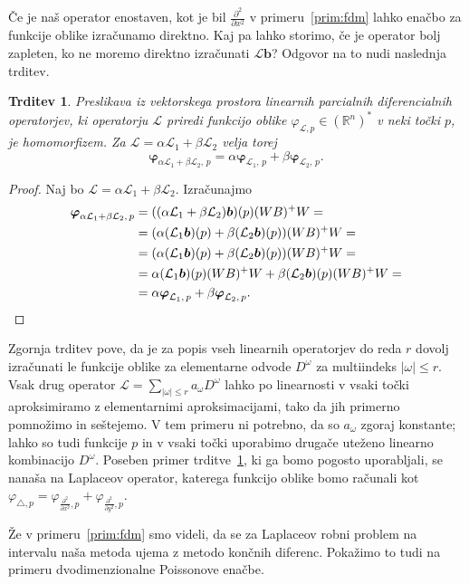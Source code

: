 \documentclass[12pt,a4paper,twoside]{article}
\theoremstyle{definition} %
\theoremstyle{plain} %
\newtheorem{trditev}[definicija]{Trditev}
\numberwithin{equation}{section}
\newcommand{\R}{\mathbb R}
\renewcommand{\L}{\mathcal{L}}
\newcommand{\lap}{\triangle}
\renewcommand{\b}{\boldsymbol}
\renewcommand{\phi}{\varphi}
\newcommand{\dpar}[2]{\ensuremath{\frac{\partial #1}{\partial #2}}}
\begin{document}
Če je naš operator enostaven, kot je bil $\dpar{^2}{x^2}$ v primeru~\ref{prim:fdm}
lahko enačbo za funkcije oblike izračunamo direktno. Kaj pa lahko storimo, če je operator bolj
zapleten, ko ne moremo direktno izračunati $\L \b b$? Odgovor na to nudi naslednja trditev.
\begin{trditev}
  \label{trd:shape-linear}
  Preslikava iz vektorskega prostora linearnih parcialnih diferencialnih operatorjev, ki operatorju
  $\L$ priredi funkcijo oblike $\phi_{\L, p} \in (\R^n)^\ast$ v neki točki $p$, je homomorfizem. Za
  $\L = \alpha \L_1 + \beta \L_2$ velja torej
  \begin{equation}
    \b{\phi}_{\alpha \L_1 + \beta \L_2,\,p} =  \alpha \b{\phi}_{\L_1,\,p} + \beta \b{\phi}_{\L_2,\,p}.
  \end{equation}
\end{trditev}
\begin{proof}
Naj bo $\L = \alpha \L_1 + \beta \L_2$. Izračunajmo
  \begin{align*}
    \b{\phi}_{\alpha \L_1 + \beta \L_2,\,p} &=
    ((\alpha \L_1 + \beta \L_2)\b b)(p)(WB)^+W = \\
    &= (\alpha (\L_1\b b)(p) + \beta (\L_2\b b)(p))(WB)^+W = \\
    &= (\alpha (\L_1\b b)(p) + \beta (\L_2\b b)(p))(WB)^+W =\\
  &= \alpha (\L_1\b b)(p)(WB)^+W + \beta (\L_2\b b)(p)(WB)^+W = \\
  &= \alpha \b{\phi}_{\L_1,\,p} + \beta \b{\phi}_{\L_2,\,p}. \qedhere
  \end{align*}
\end{proof}
Zgornja trditev pove, da je za popis vseh linearnih operatorjev do reda $r$ dovolj izračunati le
funkcije oblike za elementarne odvode $D^\omega$ za multiindeks $|\omega| \leq r$. Vsak drug
operator $\L = \sum_{|\omega| \leq r} a_\omega D^\omega$ lahko po linearnosti v vsaki točki
aproksimiramo z elementarnimi aproksimacijami, tako da jih primerno pomnožimo in seštejemo. V tem
primeru ni potrebno, da so $a_\omega$ zgoraj konstante; lahko so tudi funkcije $p$ in v vsaki točki
uporabimo drugače uteženo linearno kombinacijo $D^\omega$. Poseben primer
trditve~\ref{trd:shape-linear}, ki ga bomo pogosto uporabljali, se nanaša na Laplaceov operator,
katerega funkcijo oblike bomo računali kot $\phi_{\lap, p} = \phi_{\dpar{^2}{x^2}, p} +
\phi_{\dpar{^2}{y^2}, p}$.

Že v primeru~\ref{prim:fdm} smo videli, da se za Laplaceov robni problem na
intervalu naša metoda ujema z metodo končnih diferenc. Pokažimo to tudi na
primeru dvodimenzionalne Poissonove enačbe.
\end{document}
